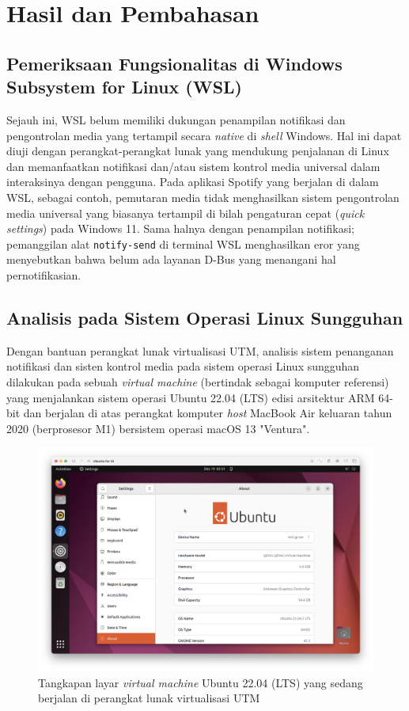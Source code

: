 \chapter{Hasil dan Pembahasan}

\section{Pemeriksaan Fungsionalitas di Windows Subsystem for Linux (WSL)}

Sejauh ini, WSL belum memiliki dukungan penampilan notifikasi dan pengontrolan media yang tertampil secara \textit{native} di \textit{shell} Windows. Hal ini dapat diuji dengan perangkat-perangkat lunak yang mendukung penjalanan di Linux dan memanfaatkan notifikasi dan/atau sistem kontrol media universal dalam interaksinya dengan pengguna. Pada aplikasi Spotify yang berjalan di dalam WSL, sebagai contoh, pemutaran media tidak menghasilkan sistem pengontrolan media universal yang biasanya tertampil di bilah pengaturan cepat (\textit{quick settings}) pada Windows 11. Sama halnya dengan penampilan notifikasi; pemanggilan alat \verb|notify-send| di terminal WSL menghasilkan eror yang menyebutkan bahwa belum ada layanan D-Bus yang menangani hal pernotifikasian.


\section{Analisis pada Sistem Operasi Linux Sungguhan}

Dengan bantuan perangkat lunak virtualisasi UTM, analisis sistem penanganan notifikasi dan sisten kontrol media pada sistem operasi Linux sungguhan dilakukan pada sebuah \textit{virtual machine} (bertindak sebagai komputer referensi) yang menjalankan sistem operasi Ubuntu 22.04 (LTS) edisi arsitektur ARM 64-bit dan berjalan di atas perangkat komputer \textit{host} MacBook Air keluaran tahun 2020 (berprosesor M1) bersistem operasi macOS 13 "Ventura".

\begin{figure}[h]
    \centering
    \includegraphics[width=0.75\linewidth]{archives//contents-template-pak-prapto//chapter-4/Screenshot 2023-12-19 at 10.51.04.png}
    \caption{Tangkapan layar \textit{virtual machine} Ubuntu 22.04 (LTS) yang sedang berjalan di perangkat lunak virtualisasi UTM}
    \label{fig:enter-label}
\end{figure}

